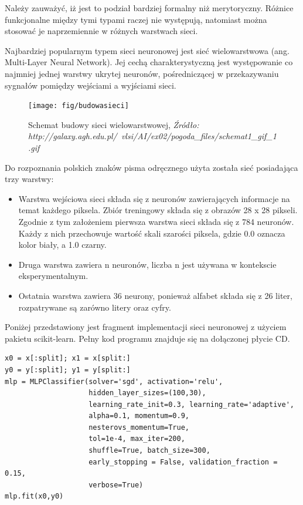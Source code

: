 \documentclass[brudnopis]{xmgr}
\begin{document}
Należy zauważyć, iż jest to podział bardziej formalny niż merytoryczny. Różnice funkcjonalne między tymi typami raczej nie występują, natomiast można stosować je naprzemiennie w różnych warstwach sieci.

Najbardziej popularnym typem sieci neuronowej jest sieć wielowarstwowa (ang. Multi-Layer Neural Network). Jej cechą charakterystyczną jest występowanie co najmniej jednej warstwy ukrytej neuronów, pośredniczącej w przekazywaniu sygnałów pomiędzy wejściami a wyjściami sieci.

\begin{figure}[!tbh]
\centering
\texttt{[image: fig/budowasieci]}
\caption{Schemat budowy sieci wielowarstwowej, \emph{Źródło: http://galaxy.agh.edu.pl/~vlsi/AI/ex02/pogoda\_files/schemat1\_gif\_1.gif}}
\end{figure}
\newpage

Do rozpoznania polskich znaków pisma odręcznego użyta została sieć posiadająca trzy warstwy:

\begin{itemize}
\item
Warstwa wejściowa sieci składa się z neuronów zawierających informacje na temat każdego piksela. Zbiór treningowy składa się z obrazów 28 x 28 pikseli. Zgodnie z tym założeniem pierwsza warstwa sieci składa się z 784 neuronów. Każdy z nich przechowuje wartość skali szarości piksela, gdzie 0.0 oznacza kolor biały, a 1.0 czarny.
\item
Druga warstwa zawiera n neuronów, liczba n jest używana w kontekscie eksperymentalnym.
\item
Ostatnia warstwa zawiera 36 neurony, ponieważ alfabet składa się z 26 liter, rozpatrywane są zarówno litery oraz cyfry.
\end{itemize}

Poniżej przedstawiony jest fragment implementacji sieci neuronowej z użyciem pakietu scikit-learn\cite{17}. Pełny kod programu znajduje się na dołączonej płycie CD.

\begin{verbatim}
x0 = x[:split]; x1 = x[split:]
y0 = y[:split]; y1 = y[split:]
mlp = MLPClassifier(solver='sgd', activation='relu',
                    hidden_layer_sizes=(100,30),
                    learning_rate_init=0.3, learning_rate='adaptive', 
                    alpha=0.1, momentum=0.9, 
                    nesterovs_momentum=True,
                    tol=1e-4, max_iter=200,
                    shuffle=True, batch_size=300,
                    early_stopping = False, validation_fraction = 0.15,
                    verbose=True)
mlp.fit(x0,y0)
\end{verbatim}
\end{document}
